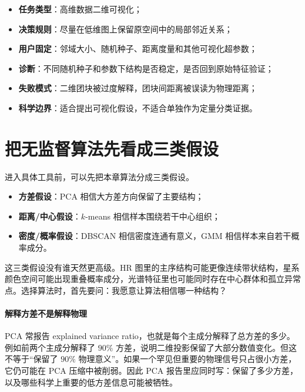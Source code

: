 \begin{examplebox}
\begin{itemize}
    \item \textbf{任务类型}：高维数据二维可视化；
    \item \textbf{决策规则}：尽量在低维图上保留原空间中的局部邻近关系；
    \item \textbf{用户固定}：邻域大小、随机种子、距离度量和其他可视化超参数；
    \item \textbf{诊断}：不同随机种子和参数下结构是否稳定，是否回到原始特征验证；
    \item \textbf{失败模式}：二维团块被过度解释，团块间距离被误读为物理距离；
    \item \textbf{科学边界}：适合提出可视化假设，不适合单独作为定量分类证据。
\end{itemize}
\end{examplebox}

\section{把无监督算法先看成三类假设}

进入具体工具前，可以先把本章算法分成三类假设。

\begin{itemize}
    \item \textbf{方差假设}：PCA 相信大方差方向保留了主要结构；
    \item \textbf{距离/中心假设}：\(k\)-means 相信样本围绕若干中心组织；
    \item \textbf{密度/概率假设}：DBSCAN 相信密度连通有意义，GMM 相信样本来自若干概率成分。
\end{itemize}

这三类假设没有谁天然更高级。HR 图里的主序结构可能更像连续带状结构，星系颜色空间可能出现重叠概率成分，光谱特征里也可能同时存在中心群体和孤立异常点。选择算法时，首先要问：我愿意让算法相信哪一种结构？

\paragraph{解释方差不是解释物理}

PCA 常报告 explained variance ratio，也就是每个主成分解释了总方差的多少。例如前两个主成分解释了 \(90\%\) 方差，说明二维投影保留了大部分数值变化。但这不等于“保留了 \(90\%\) 物理意义”。如果一个罕见但重要的物理信号只占很小方差，它仍可能在 PCA 压缩中被削弱。因此 PCA 报告里应同时写：保留了多少方差，以及哪些科学上重要的低方差信息可能被牺牲。

